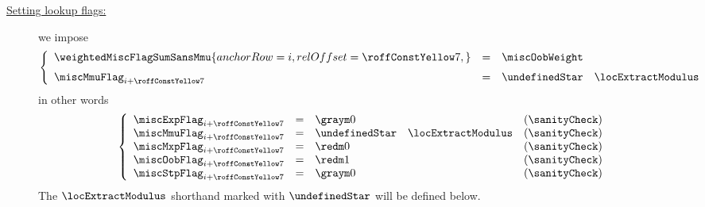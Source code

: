 \begin{description}
		\begin{description}
			\item[\underline{Setting lookup flags:}]
				we impose
				\[
					\left\{ \begin{array}{lclr}
						\weightedMiscFlagSumSansMmu {
							anchorRow = i                                     ,
							relOffset = \prcModexpSuccessExtractBaseRowOffset ,
						}
						& = & \miscOobWeight                          \vspace{2mm} \\
						\miscMmuFlag _{i + \prcModexpSuccessExtractBaseRowOffset} & = & \undefinedStar \quad \locExtractModulus              \\
					\end{array} \right.
				\]
				in other words
				\[
					\left\{ \begin{array}{lclr}
						\miscExpFlag _{i + \prcModexpSuccessExtractBaseRowOffset} & = & \gZero                                  & (\sanityCheck) \\
						\miscMmuFlag _{i + \prcModexpSuccessExtractBaseRowOffset} & = & \undefinedStar \quad \locExtractModulus & (\sanityCheck) \\
						\miscMxpFlag _{i + \prcModexpSuccessExtractBaseRowOffset} & = & \rZero                                  & (\sanityCheck) \\
						\miscOobFlag _{i + \prcModexpSuccessExtractBaseRowOffset} & = & \one                                    & (\sanityCheck) \\
						\miscStpFlag _{i + \prcModexpSuccessExtractBaseRowOffset} & = & \gZero                                  & (\sanityCheck) \\
					\end{array} \right.
				\]
				\saNote{}
				The $\locExtractModulus$ shorthand marked with $\undefinedStar$ will be defined below.


\end{description}
\end{description}
